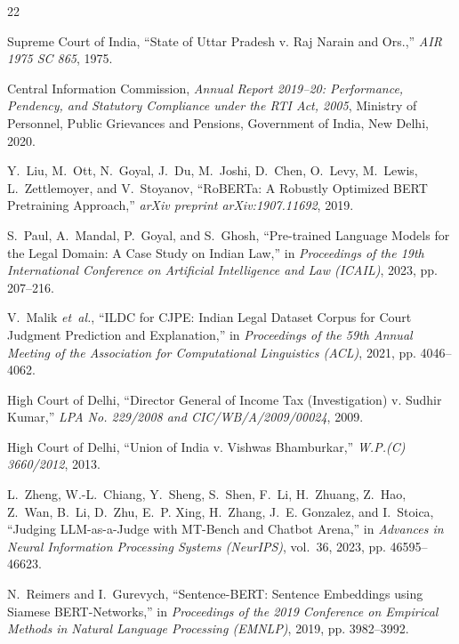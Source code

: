 \documentclass[conference]{IEEEtran}
\begin{document}
\balance


\begin{thebibliography}{22}
\setlength{\itemsep}{1.0pt plus 0.5pt minus 0.5pt}

Supreme Court of India, ``State of Uttar Pradesh v. Raj Narain and Ors.,'' \emph{AIR 1975 SC 865}, 1975.

Central Information Commission, \emph{Annual Report 2019--20: Performance, Pendency, and Statutory Compliance under the RTI Act, 2005}, Ministry of Personnel, Public Grievances and Pensions, Government of India, New Delhi, 2020.

Y.~Liu, M.~Ott, N.~Goyal, J.~Du, M.~Joshi, D.~Chen, O.~Levy, M.~Lewis, L.~Zettlemoyer, and V.~Stoyanov, ``RoBERTa: A Robustly Optimized BERT Pretraining Approach,'' \emph{arXiv preprint arXiv:1907.11692}, 2019.

S.~Paul, A.~Mandal, P.~Goyal, and S.~Ghosh, ``Pre-trained Language Models for the Legal Domain: A Case Study on Indian Law,'' in \emph{Proceedings of the 19th International Conference on Artificial Intelligence and Law (ICAIL)}, 2023, pp. 207--216.

V.~Malik \emph{et~al.}, ``ILDC for CJPE: Indian Legal Dataset Corpus for Court Judgment Prediction and Explanation,'' in \emph{Proceedings of the 59th Annual Meeting of the Association for Computational Linguistics (ACL)}, 2021, pp. 4046--4062.

High Court of Delhi, ``Director General of Income Tax (Investigation) v. Sudhir Kumar,'' \emph{LPA No. 229/2008 and CIC/WB/A/2009/00024}, 2009.

High Court of Delhi, ``Union of India v. Vishwas Bhamburkar,'' \emph{W.P.(C) 3660/2012}, 2013.

L.~Zheng, W.-L.~Chiang, Y.~Sheng, S.~Shen, F.~Li, H.~Zhuang, Z.~Hao, Z.~Wan, B.~Li, D.~Zhu, E.~P. Xing, H.~Zhang, J.~E. Gonzalez, and I.~Stoica, ``Judging LLM-as-a-Judge with MT-Bench and Chatbot Arena,'' in \emph{Advances in Neural Information Processing Systems (NeurIPS)}, vol.~36, 2023, pp. 46595--46623.

N.~Reimers and I.~Gurevych, ``Sentence-BERT: Sentence Embeddings using Siamese BERT-Networks,'' in \emph{Proceedings of the 2019 Conference on Empirical Methods in Natural Language Processing (EMNLP)}, 2019, pp. 3982--3992.


\end{thebibliography}
\end{document}
